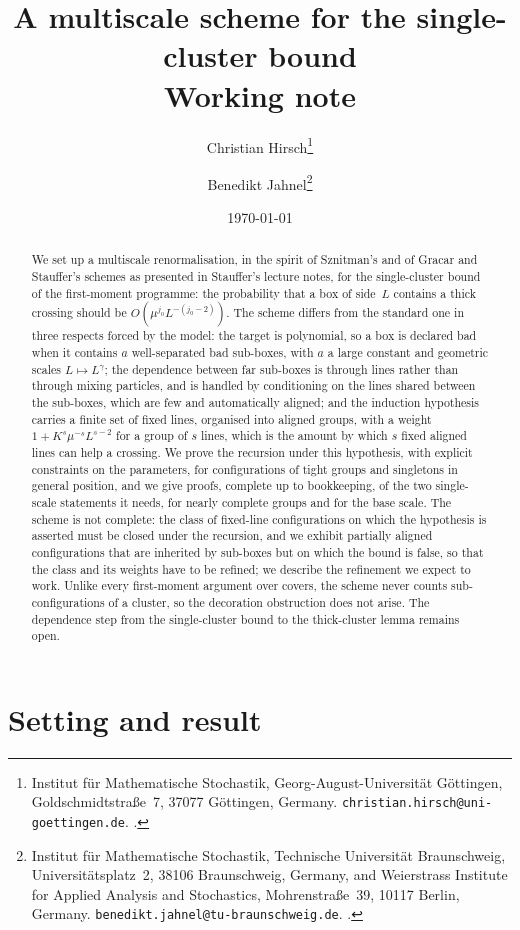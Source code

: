 \documentclass[11pt,letterpaper]{article}
\title{\textbf{A multiscale scheme for the single-cluster bound}\\[0.6em] \large Working note}
\author{%
  Christian Hirsch\thanks{Institut f\"ur Mathematische Stochastik, Georg-August-Universit\"at G\"ottingen, Goldschmidtstra\ss e~7, 37077 G\"ottingen, Germany. \texttt{christian.hirsch@uni-goettingen.de}. \orcid{0000-0003-4136-3740}.}
  \and
  Benedikt Jahnel\thanks{Institut f\"ur Mathematische Stochastik, Technische Universit\"at Braunschweig, Universit\"atsplatz~2, 38106 Braunschweig, Germany, and Weierstrass Institute for Applied Analysis and Stochastics, Mohrenstra\ss e~39, 10117 Berlin, Germany. \texttt{benedikt.jahnel@tu-braunschweig.de}. \orcid{0000-0002-4212-0065}.}%
}
\date{\today}
\begin{document}
\maketitle
\thispagestyle{plain}

\begin{abstract}
We set up a multiscale renormalisation, in the spirit of Sznitman's and of Gracar and Stauffer's schemes as presented in Stauffer's lecture notes, for the single-cluster bound of the first-moment programme: the probability that a box of side~$L$ contains a thick crossing should be $O(\mu^{j_0}L^{-(j_0-2)})$. The scheme differs from the standard one in three respects forced by the model: the target is polynomial, so a box is declared bad when it contains $a$ well-separated bad sub-boxes, with $a$ a large constant and geometric scales $L\mapsto L^{\gamma}$; the dependence between far sub-boxes is through lines rather than through mixing particles, and is handled by conditioning on the lines shared between the sub-boxes, which are few and automatically aligned; and the induction hypothesis carries a finite set of fixed lines, organised into aligned groups, with a weight $1+K^s\mu^{-s}L^{s-2}$ for a group of $s$ lines, which is the amount by which $s$ fixed aligned lines can help a crossing. We prove the recursion under this hypothesis, with explicit constraints on the parameters, for configurations of tight groups and singletons in general position, and we give proofs, complete up to bookkeeping, of the two single-scale statements it needs, for nearly complete groups and for the base scale. The scheme is not complete: the class of fixed-line configurations on which the hypothesis is asserted must be closed under the recursion, and we exhibit partially aligned configurations that are inherited by sub-boxes but on which the bound is false, so that the class and its weights have to be refined; we describe the refinement we expect to work. Unlike every first-moment argument over covers, the scheme never counts sub-configurations of a cluster, so the decoration obstruction does not arise. The dependence step from the single-cluster bound to the thick-cluster lemma remains open.
\end{abstract}

\section{Setting and result}
\label{sec:setting}
\end{document}
